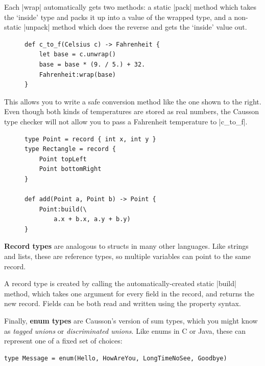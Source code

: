 \documentclass[11pt]{report}
\begin{document}
Each |wrap| automatically gets two methods: a static |pack| method which takes the `inside' type and packs it up into a value of the wrapped type, and a non-static |unpack| method which does the reverse and gets the `inside' value out.

\begin{figure}
\begin{Verbatim}
def c_to_f(Celsius c) -> Fahrenheit {
    let base = c.unwrap()
    base = base * (9. / 5.) + 32.
    Fahrenheit:wrap(base)
}
\end{Verbatim}
\vspace{-0.5cm}
\end{figure}

This allows you to write a safe conversion method like the one shown to the right. Even though both kinds of temperatures are stored as real numbers, the Causson type checker will not allow you to pass a Fahrenheit temperature to |c_to_f|.

\begin{figure}
\vspace{-0.5cm}
\begin{Verbatim}
type Point = record { int x, int y }
type Rectangle = record {
    Point topLeft
    Point bottomRight
}

def add(Point a, Point b) -> Point {
    Point:build(\
        a.x + b.x, a.y + b.y)
}
\end{Verbatim}
\vspace{-0.5cm}
\end{figure}

\textbf{Record types} are analogous to structs in many other languages. Like strings and lists, these are reference types, so multiple variables can point to the same record.

A record type is created by calling the automatically-created static |build| method, which takes one argument for every field in the record, and returns the new record. Fields can be both read and written using the property syntax.

Finally, \textbf{enum types} are Causson's version of sum types, which you might know as \emph{tagged unions} or \emph{discriminated unions}. Like enums in C or Java, these can represent one of a fixed set of choices:

\begin{Verbatim}
type Message = enum(Hello, HowAreYou, LongTimeNoSee, Goodbye)
\end{Verbatim}
\end{document}
